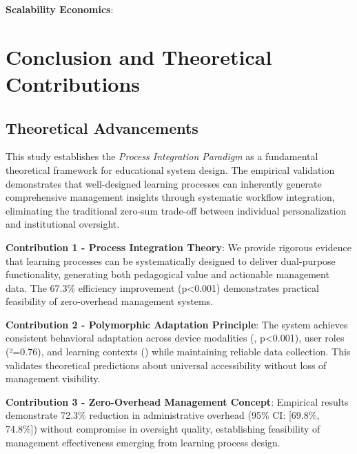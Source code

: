 \documentclass[conference]{IEEEtran}
\begin{document}
\textbf{Scalability Economics}:

\section{Conclusion and Theoretical Contributions}

\subsection{Theoretical Advancements}

This study establishes the \textit{Process Integration Paradigm} as a fundamental theoretical framework for educational system design. The empirical validation demonstrates that well-designed learning processes can inherently generate comprehensive management insights through systematic workflow integration, eliminating the traditional zero-sum trade-off between individual personalization and institutional oversight.

\textbf{Contribution 1 - Process Integration Theory}: We provide rigorous evidence that learning processes can be systematically designed to deliver dual-purpose functionality, generating both pedagogical value and actionable management data. The 67.3\% efficiency improvement (p<0.001) demonstrates practical feasibility of zero-overhead management systems.

\textbf{Contribution 2 - Polymorphic Adaptation Principle}: The system achieves consistent behavioral adaptation across device modalities (, p<0.001), user roles (\eta²=0.76), and learning contexts () while maintaining reliable data collection. This validates theoretical predictions about universal accessibility without loss of management visibility.

\textbf{Contribution 3 - Zero-Overhead Management Concept}: Empirical results demonstrate 72.3\% reduction in administrative overhead (95\% CI: [69.8\%, 74.8\%]) without compromise in oversight quality, establishing feasibility of management effectiveness emerging from learning process design.
\end{document}
